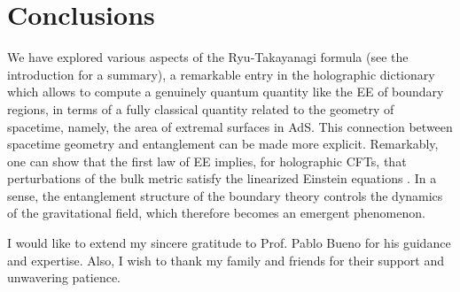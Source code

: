 \documentclass[twocolumn]{revtex4}
\begin{document}
\section{Conclusions} \label{s:Conclusions}
We have explored various aspects of the Ryu-Takayanagi formula (see the introduction for a summary), a remarkable entry in the holographic dictionary which allows to compute a genuinely quantum quantity like the EE of boundary regions, in terms of a fully classical quantity related to the geometry of spacetime, namely, the area of extremal surfaces in AdS. This connection between spacetime geometry and entanglement can be made more explicit. Remarkably, one can show that the first law of EE implies, for holographic CFTs, that perturbations of the bulk metric satisfy the linearized Einstein equations \cite{faulkner_gravitation_2014}. In a sense, the entanglement structure of the boundary theory controls the dynamics of the gravitational field, which therefore becomes an emergent phenomenon.



\begin{acknowledgments}

    I would like to extend my sincere gratitude to Prof. Pablo Bueno for his guidance and expertise. Also, I wish to thank my family and friends for their support and unwavering patience.
    
\end{acknowledgments}




% 
\end{document}
